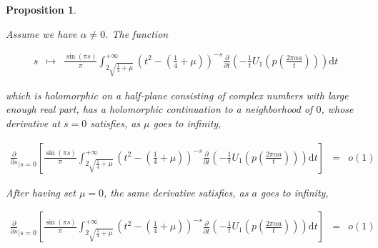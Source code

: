 \documentclass{jams-l}
\newtheorem{proposition}[theorem]{Proposition}
\theoremstyle{definition}
\theoremstyle{remark}
\numberwithin{equation}{section}
\begin{document}
                \begin{proposition}
                \label{PropMTilde4-0}
                
                    Assume we have $\alpha \neq 0$. The function
                    
                    \[ \begin{array}{lll}
                            s & \longmapsto & \frac{\sin \left( \pi s \right)}{\pi} \int_{2 \sqrt{\frac{1}{4} + \mu}}^{+ \infty} \left( t^2 - \left( \frac{1}{4} + \mu \right) \right)^{-s} \frac{\partial}{\partial t} \left( - \frac{1}{t} U_1 \left( p \left( \frac{2 \pi \alpha a}{t} \right) \right) \right) \mathrm{d}t
                        \end{array} \]
                    
                    \noindent which is holomorphic on a half-plane consisting of complex numbers with large enough real part, has a holomorphic continuation to a neighborhood of $0$, whose derivative at $s=0$ satisfies, as $\mu$ goes to infinity,
                    
                    \[ \begin{array}{lll}
                            \scriptstyle \frac{\partial}{\partial s}_{\left \vert s = 0 \right.} \left[ \frac{\sin \left( \pi s \right)}{\pi} \int_{2 \sqrt{\frac{1}{4} + \mu}}^{+ \infty} \left( t^2 - \left( \frac{1}{4} + \mu \right) \right)^{-s} \frac{\partial}{\partial t} \left( - \frac{1}{t} U_1 \left( p \left( \frac{2 \pi \alpha a}{t} \right) \right) \right) \mathrm{d}t \right]& \scriptstyle = & \scriptstyle o \left( 1 \right)
                        \end{array} \]
                    
                    \noindent After having set $\mu = 0$, the same derivative satisfies, as $a$ goes to infinity,
                    
                    \[ \begin{array}{lll}
                            \scriptstyle \frac{\partial}{\partial s}_{\left \vert s = 0 \right.} \left[ \frac{\sin \left( \pi s \right)}{\pi} \int_{2 \sqrt{\frac{1}{4} + \mu}}^{+ \infty} \left( t^2 - \left( \frac{1}{4} + \mu \right) \right)^{-s} \frac{\partial}{\partial t} \left( - \frac{1}{t} U_1 \left( p \left( \frac{2 \pi \alpha a}{t} \right) \right) \right) \mathrm{d}t \right] & \scriptstyle = & \scriptstyle o \left( 1 \right)
                        \end{array} \]
                
                \end{proposition}
                
\end{document}
